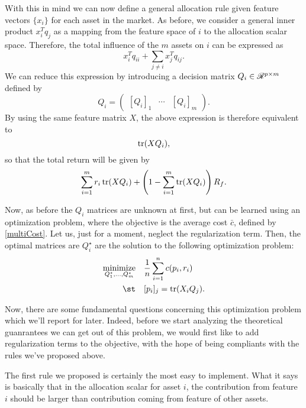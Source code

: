 With this in mind we can now define a general allocation rule given feature vectors
$\{x_i\}$ for each asset in the market. As before, we consider a general inner product
$x_i^Tq_j$ as a mapping from the feature space of $i$ to the allocation scalar
space. Therefore, the total influence of the $m$ assets on $i$ can be expressed as 
\begin{equation}
  x_i^{T}q_{ii} + \sum_{j\neq i}x_j^{T}q_{ij}.
\end{equation}
We can reduce this expression by introducing a decision matrix $Q_i \in \mathscr{R}^{p\times{}m}$ defined by
\begin{equation}
  Q_i = \begin{pmatrix}[Q_i]_1 & \cdots & [Q_i]_m\end{pmatrix}.
\end{equation}
By using the same feature matrix $X$, the above expression is therefore equivalent to
\begin{equation}
  \operatorname{tr}(XQ_i),
\end{equation}
so that the total return will be given by
\begin{equation}
  \sum_{i=1}^m r_i \operatorname{tr}(XQ_i) + \left(1 - \sum_{i=1}^m\operatorname{tr}(X Q_i)\right)R_f.
\end{equation}

Now, as before the $Q_i$ matrices are unknown at first, but can be learned using an
optimization problem, where the objective is the average cost $\bar{c}$, defined by
\eqref{multiCost}. Let us, just for a moment, neglect the regularization term. Then, the
optimal matrices are $Q_i^\star$ are the solution to the following optimization problem:
\begin{align}
  \label{optProblemMulti}
  \minimize_{Q_1^\star,\dots,Q_m^\star} \quad & \frac{1}{n} \sum_{i=1}^{n}c(p_i,r_i)\\
  \st \quad & [p_i]_j = \tr(X_iQ_j).\nonumber
\end{align}

Now, there are some fundamental questions concerning this optimization problem which we'll
report for later. Indeed, before we start analyzing the theoretical guanrantees we can get
out of this problem, we would first like to add regularization terms to the objective,
with the hope of being compliants with the rules we've proposed above.

The first rule we proposed is certainly the most easy to implement. What it says is
basically that in the allocation scalar for asset $i$, the contribution from feature $i$
should be larger than contribution coming from feature of other assets. 


